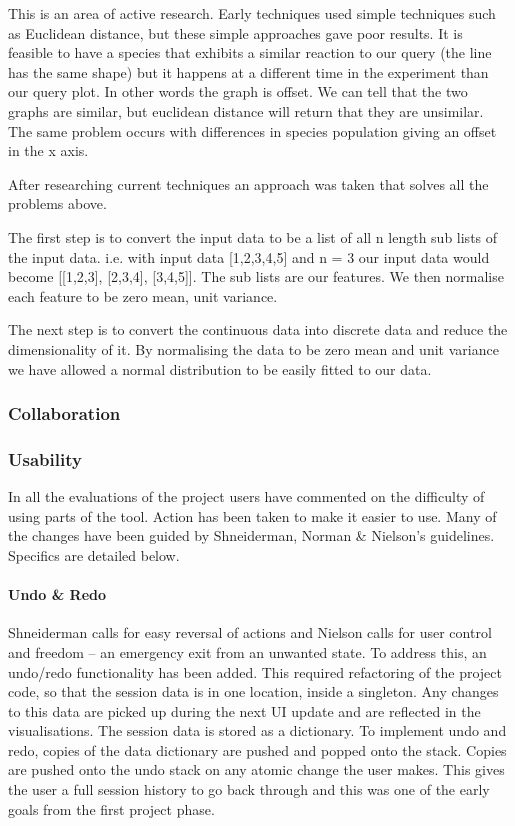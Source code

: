 This is an area of active research.  Early techniques used simple techniques such as Euclidean distance, but these simple approaches gave poor results.  It is feasible to have a species that exhibits a similar reaction to our query (the line has the same shape) but it happens at a different time in the experiment than our query plot.  In other words the graph is offset.  We can tell that the two graphs are similar, but euclidean distance will return that they are unsimilar.  The same problem occurs with differences in species population giving an offset in the x axis.

After researching current techniques an approach was taken that solves all the problems above.

The first step is to convert the input data to be a list of all n length sub lists of the input data. i.e. with input data [1,2,3,4,5] and n = 3 our input data would become [[1,2,3], [2,3,4], [3,4,5]].  The sub lists are our features.  We then normalise each feature to be zero mean, unit variance.

The next step is to convert the continuous data into discrete data and reduce the dimensionality of it.  By normalising the data to be zero mean and unit variance we have allowed a normal distribution to be easily fitted to our data.
\subsubsection{Collaboration}

\subsubsection{Usability}

In all the evaluations of the project users have commented on the difficulty of using parts of the tool.  Action has been taken to make it easier to use.  Many of the changes have been guided by Shneiderman, Norman \& Nielson's guidelines.  Specifics are detailed below.

\paragraph{Undo \& Redo}
Shneiderman calls for easy reversal of actions and Nielson calls for user control and freedom -- an emergency exit from an unwanted state.  To address this, an undo/redo functionality has been added.  This required refactoring of the project code, so that the session data is in one location, inside a singleton. Any changes to this data are picked up during the next \ac{UI} update and are reflected in the visualisations.  The session data is stored as a dictionary.  To implement undo and redo, copies of the data dictionary are pushed and popped onto the stack.  Copies are pushed onto the undo stack on any atomic change the user makes.  This gives the user a full session history to go back through and this was one of the early goals from the first project phase.


